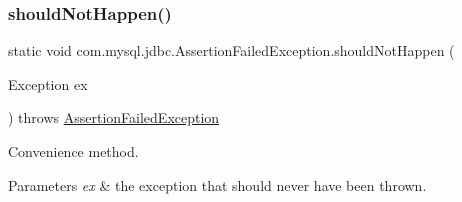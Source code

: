 \subsubsection{\texorpdfstring{should\+Not\+Happen()}{shouldNotHappen()}}
{\footnotesize\ttfamily static void com.\+mysql.\+jdbc.\+Assertion\+Failed\+Exception.\+should\+Not\+Happen (\begin{DoxyParamCaption}\item[{Exception}]{ex }\end{DoxyParamCaption}) throws \mbox{\hyperlink{classcom_1_1mysql_1_1jdbc_1_1_assertion_failed_exception}{Assertion\+Failed\+Exception}}\hspace{0.3cm}{\ttfamily [static]}}

Convenience method.


\begin{DoxyParams}{Parameters}
{\em ex} & the exception that should never have been thrown. \\
\hline
\end{DoxyParams}

